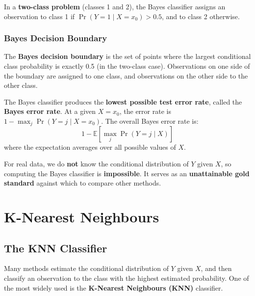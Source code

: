 \documentclass[11pt,a4paper]{article}
\theoremstyle{definition}
\theoremstyle{plain}
\theoremstyle{remark}
\begin{document}
In a \textbf{two-class problem} (classes 1 and 2), the Bayes classifier assigns an observation to class 1 if $\Pr(Y = 1 \mid X = x_0) > 0.5$, and to class 2 otherwise.

\subsubsection{Bayes Decision Boundary}

The \textbf{Bayes decision boundary} is the set of points where the largest conditional class probability is exactly 0.5 (in the two-class case). Observations on one side of the boundary are assigned to one class, and observations on the other side to the other class.

The Bayes classifier produces the \textbf{lowest possible test error rate}, called the \textbf{Bayes error rate}. At a given $X = x_0$, the error rate is $1 - \max_j \Pr(Y = j \mid X = x_0)$. The overall Bayes error rate is:
\[
    1 - \mathbb{E}\!\left[\max_j \Pr(Y = j \mid X)\right]
\]
where the expectation averages over all possible values of $X$.

\begin{tcolorbox}[colback=orange!5!white,colframe=orange!75!black,title=\textbf{The Bayes Classifier is Unattainable}]
For real data, we do \textbf{not} know the conditional distribution of $Y$ given $X$, so computing the Bayes classifier is \textbf{impossible}. It serves as an \textbf{unattainable gold standard} against which to compare other methods.
\end{tcolorbox}

\section{K-Nearest Neighbours}

\subsection{The KNN Classifier}

Many methods estimate the conditional distribution of $Y$ given $X$, and then classify an observation to the class with the highest estimated probability. One of the most widely used is the \textbf{K-Nearest Neighbours (KNN)} classifier.
\end{document}
